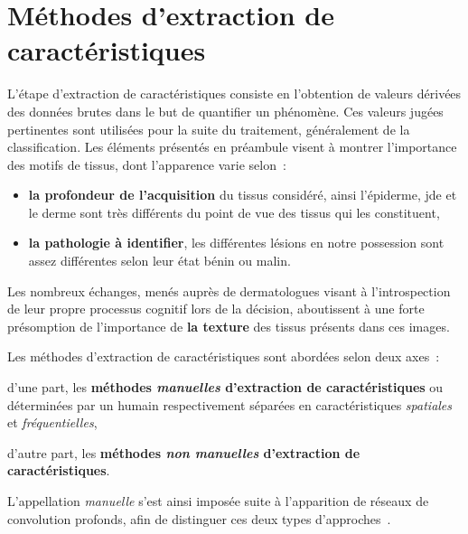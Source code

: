 \newpage

\section{Méthodes d'extraction de caractéristiques}
\label{chap:feature_extraction}
L'étape d'extraction de caractéristiques consiste en l'obtention de valeurs dérivées des données brutes dans le but de quantifier un phénomène. Ces valeurs jugées pertinentes sont utilisées pour la suite du traitement, généralement de la classification. Les éléments présentés en préambule visent à montrer l'importance des motifs de tissus, dont l'apparence varie selon~:
\begin{itemize}
    \item \textbf{la profondeur de l'acquisition} du tissus considéré, ainsi l'épiderme, \gls{jde} et le derme sont très différents du point de vue des tissus qui les constituent,
    \item \textbf{la pathologie à identifier}, les différentes lésions en notre possession sont assez différentes selon leur état bénin ou malin.
\end{itemize}
Les nombreux échanges, menés auprès de dermatologues visant à l'introspection de leur propre processus cognitif lors de la décision, aboutissent à une forte présomption de l'importance de \textbf{la texture} des tissus présents dans ces images.\par

Les méthodes d'extraction de caractéristiques sont abordées selon deux axes~:
\begin{inlinerate}
    \item d'une part, les \textbf{méthodes \textit{manuelles} d'extraction de caractéristiques} ou déterminées par un humain respectivement séparées en caractéristiques \textit{spatiales} et \textit{fréquentielles},
    \item d'autre part, les \textbf{méthodes \textit{non manuelles} d'extraction de caractéristiques}.
\end{inlinerate} 
L'appellation \textit{manuelle} s'est ainsi imposée suite à l'apparition de réseaux de convolution profonds, afin de distinguer ces deux types d'approches~\cite{Nanni2017}.\par

